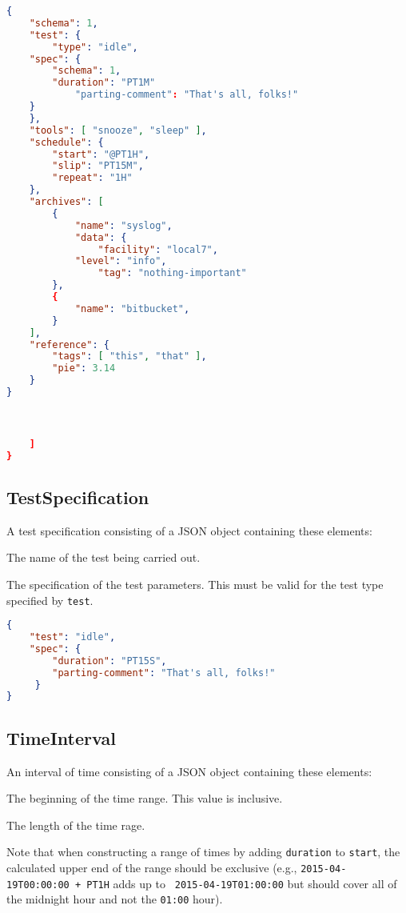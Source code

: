 \documentclass[10pt]{article}
\begin{document}
\example
\begin{lstlisting}[language=json]
{
    "schema": 1,
    "test": {
        "type": "idle",
	"spec": {
	    "schema": 1,
	    "duration": "PT1M"
            "parting-comment": "That's all, folks!"
	}
    },
    "tools": [ "snooze", "sleep" ],
    "schedule": {
        "start": "@PT1H",
        "slip": "PT15M",
        "repeat": "1H"
    },
    "archives": [
        {
            "name": "syslog",
            "data": {
                "facility": "local7",
        	"level": "info",
                "tag": "nothing-important"
        },
        {
            "name": "bitbucket",
        }
    ],
    "reference": {
        "tags": [ "this", "that" ],
        "pie": 3.14
    }
}



    ]
}
\end{lstlisting}




\subsection{TestSpecification}
A test specification consisting of a JSON object containing these
elements:

 The name of the test being carried out.

 The specification of the test parameters.
This must be valid for the test type specified by {\tt test}.

\example
\begin{lstlisting}[language=json]
{
    "test": "idle",
    "spec": {
        "duration": "PT15S",
        "parting-comment": "That's all, folks!"
     }
}
\end{lstlisting}




\subsection{TimeInterval}
An interval of time consisting of a JSON object containing these
elements:

 The beginning of the time range.  This
value is inclusive.

 The length of the time rage.

Note that when constructing a range of times by adding {\tt duration}
to {\tt start}, the calculated upper end of the range should be
exclusive (e.g., {\tt 2015-04-19T00:00:00 + PT1H} adds up to {\tt
  2015-04-19T01:00:00} but should cover all of the midnight hour and
not the {\tt 01:00} hour).
\end{document}
